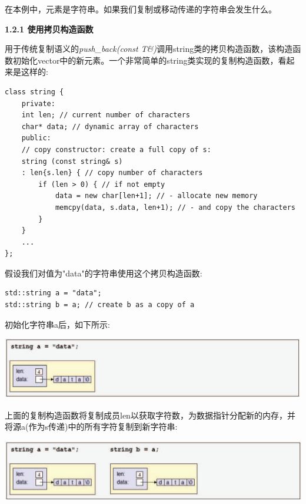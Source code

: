 在本例中，元素是字符串。如果我们复制或移动传递的字符串会发生什么。\par

\hspace*{\fill} \par %
\textbf{1.2.1 使用拷贝构造函数}

用于传统复制语义的\textit{push\_back(const T\&)}调用string类的拷贝构造函数，该构造函数初始化vector中的新元素。一个非常简单的string类实现的复制构造函数，看起来是这样的:\par

\begin{lstlisting}[caption={}]
class string {
	private:
	int len; // current number of characters
	char* data; // dynamic array of characters
	public:
	// copy constructor: create a full copy of s:
	string (const string& s)
	: len{s.len} { // copy number of characters
		if (len > 0) { // if not empty
			data = new char[len+1]; // - allocate new memory
			memcpy(data, s.data, len+1); // - and copy the characters
		}
	}
	...
};
\end{lstlisting}

假设我们对值为"data"的字符串使用这个拷贝构造函数:\par

\begin{lstlisting}[caption={}]
std::string a = "data";
std::string b = a; // create b as a copy of a
\end{lstlisting}

初始化字符串a后，如下所示:\par

\begin{center}
	\includegraphics[width=1.0\textwidth]{content/1/chapter1/images/18}
\end{center}

上面的复制构造函数将复制成员len以获取字符数，为数据指针分配新的内存，并将源a(作为s传递)中的所有字符复制到新字符串:\par

\begin{center}
	\includegraphics[width=1.0\textwidth]{content/1/chapter1/images/19}
\end{center}


